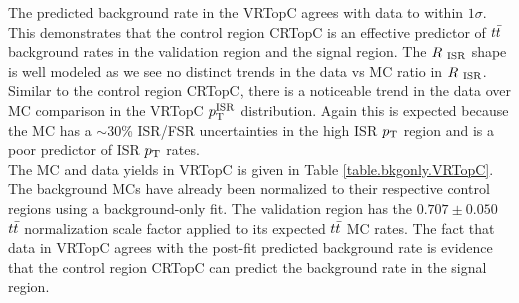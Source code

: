 \indent The predicted background rate in the VRTopC agrees with data to within $1\sigma$.  This demonstrates that the control region CRTopC is an effective predictor of $t\bar{t}$ background rates in the validation region and the signal region.  The $R_{~\mathrm{ISR}}$ shape is well modeled as we see no distinct trends in the data vs MC ratio in $R_{~\mathrm{ISR}}$. \\

\indent Similar to the control region CRTopC, there is a noticeable trend in the data over MC comparison in the VRTopC $p_{\mathrm{T}}^{\mathrm{ISR}}$ distribution.  Again this is expected because the MC has a $\sim30$\% ISR/FSR uncertainties in the high ISR $p_{\mathrm{T}}$ region and is a poor predictor of ISR $p_{\mathrm{T}}$ rates.  \\

\indent The MC and data yields in VRTopC is given in Table \ref{table.bkgonly.VRTopC}.  The background MCs have already been normalized to their respective control regions using a background-only fit.  The validation region has the $0.707 \pm 0.050$ $t\bar{t}$ normalization scale factor applied to its expected $t\bar{t}$ MC rates.  The fact that data in VRTopC agrees with the post-fit predicted background rate is evidence that the control region CRTopC can predict the background rate in the signal region.    \\



